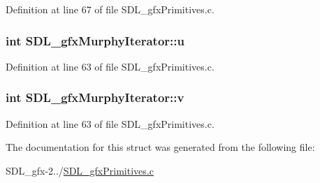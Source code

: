 Definition at line 67 of file S\+D\+L\+\_\+gfx\+Primitives.\+c.

\hypertarget{struct_s_d_l__gfx_murphy_iterator_a596dd426d7ee2c607f652b67127222f1}{}
\subsubsection[{u}]{\setlength{\rightskip}{0pt plus 5cm}int S\+D\+L\+\_\+gfx\+Murphy\+Iterator\+::u}\label{struct_s_d_l__gfx_murphy_iterator_a596dd426d7ee2c607f652b67127222f1}


Definition at line 63 of file S\+D\+L\+\_\+gfx\+Primitives.\+c.

\hypertarget{struct_s_d_l__gfx_murphy_iterator_ad5f43f4ed3084be87718e052f6a0fe62}{}
\subsubsection[{v}]{\setlength{\rightskip}{0pt plus 5cm}int S\+D\+L\+\_\+gfx\+Murphy\+Iterator\+::v}\label{struct_s_d_l__gfx_murphy_iterator_ad5f43f4ed3084be87718e052f6a0fe62}


Definition at line 63 of file S\+D\+L\+\_\+gfx\+Primitives.\+c.



The documentation for this struct was generated from the following file\+:\begin{DoxyCompactItemize}
\item 
S\+D\+L\+\_\+gfx-\/2../\hyperlink{_s_d_l__gfx_primitives_8c}{S\+D\+L\+\_\+gfx\+Primitives.\+c}\end{DoxyCompactItemize}
